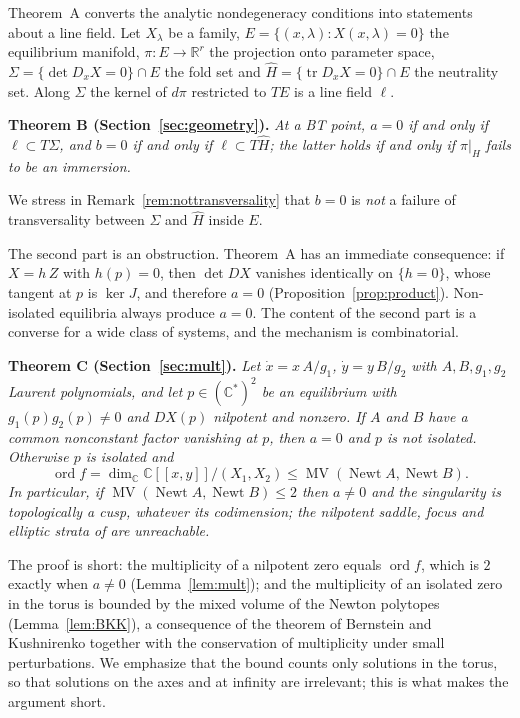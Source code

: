 \documentclass[12pt]{article}
\theoremstyle{plain}
\theoremstyle{definition}
\theoremstyle{remark}
\newcommand{\R}{\mathbb{R}}
\newcommand{\C}{\mathbb{C}}
\newcommand{\tr}{\operatorname{tr}}
\DeclareMathOperator{\dt}{det}
\DeclareMathOperator{\MV}{MV}
\DeclareMathOperator{\Newt}{Newt}
\newcommand{\Hh}{\widehat{H}}
\begin{document}
	Theorem~A converts the analytic nondegeneracy conditions into
	statements about a line field.  Let $X_{\lambda}$ be a family,
	$E=\{(x,\lambda): X(x,\lambda)=0\}$ the equilibrium manifold,
	$\pi\colon E\to\R^{r}$ the projection onto parameter space,
	$\Sigma=\{\dt D_{x}X=0\}\cap E$ the fold set and
	$\Hh=\{\tr D_{x}X=0\}\cap E$ the neutrality set.  Along $\Sigma$ the
	kernel of $d\pi$ restricted to $TE$ is a line field $\ell$.
	
	\medskip\noindent
	\textbf{Theorem B (Section~\ref{sec:geometry}).}
	\emph{At a BT point, $a=0$ if and only if $\ell\subset T\Sigma$, and
		$b=0$ if and only if $\ell\subset T\Hh$; the latter holds if and only
		if $\pi|_{\Hh}$ fails to be an immersion.}
	
	We stress in Remark~\ref{rem:nottransversality} that $b=0$ is
	\emph{not} a failure of transversality between $\Sigma$ and $\Hh$
	inside $E$.
	
	The second part is an obstruction.  Theorem~A has an immediate
	consequence: if $X=h\,Z$ with $h(p)=0$, then $\dt DX$ vanishes
	identically on $\{h=0\}$, whose tangent at $p$ is $\ker J$, and
	therefore $a=0$ (Proposition~\ref{prop:product}).  Non-isolated
	equilibria always produce $a=0$.  The content of the second part is a
	converse for a wide class of systems, and the mechanism is
	combinatorial.
	
	\medskip\noindent
	\textbf{Theorem C (Section~\ref{sec:mult}).}
	\emph{Let $\dot x=x\,A/g_{1}$, $\dot y=y\,B/g_{2}$ with $A,B,g_{1},
		g_{2}$ Laurent polynomials, and let $p\in(\C^{*})^{2}$ be an
		equilibrium with $g_{1}(p)g_{2}(p)\neq0$ and $DX(p)$ nilpotent and
		nonzero.  If $A$ and $B$ have a common nonconstant factor vanishing at
		$p$, then $a=0$ and $p$ is not isolated.  Otherwise $p$ is isolated and}
	\[
	\operatorname{ord}f
	=\dim_{\C}\C[[x,y]]/(X_{1},X_{2})
	\le \MV(\Newt A,\Newt B).
	\]
	\emph{In particular, if $\MV(\Newt A,\Newt B)\le2$ then $a\neq0$ and the
		singularity is topologically a cusp, whatever its codimension; the
		nilpotent saddle, focus and elliptic strata of \cite{DRSZ1991} are
		unreachable.}
	
	The proof is short: the multiplicity of a nilpotent zero equals
	$\operatorname{ord}f$, which is $2$ exactly when $a\neq0$
	(Lemma~\ref{lem:mult}); and the multiplicity of an isolated zero in the
	torus is bounded by the mixed volume of the Newton polytopes
	(Lemma~\ref{lem:BKK}), a consequence of the theorem of Bernstein and
	Kushnirenko \cite{Bernstein1975,Kushnirenko1976} together with the
	conservation of multiplicity under small perturbations.  We emphasize that the bound counts only
	solutions in the torus, so that solutions on the axes and at infinity
	are irrelevant; this is what makes the argument short.
	
\end{document}

